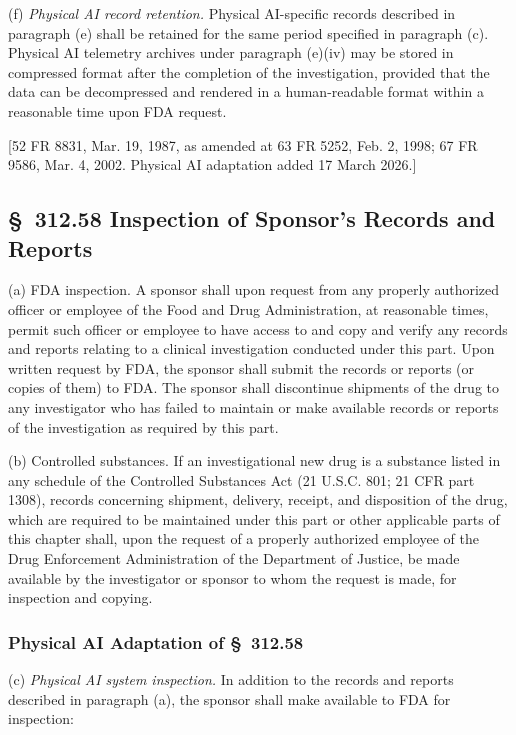 \documentclass[11pt]{article}
\begin{document}
(f) \textit{Physical AI record retention.} Physical AI-specific records described in paragraph (e) shall be retained for the same period specified in paragraph (c). Physical AI telemetry archives under paragraph (e)(iv) may be stored in compressed format after the completion of the investigation, provided that the data can be decompressed and rendered in a human-readable format within a reasonable time upon FDA request.

[52 FR 8831, Mar. 19, 1987, as amended at 63 FR 5252, Feb. 2, 1998; 67 FR 9586, Mar. 4, 2002. Physical AI adaptation added 17 March 2026.]

\subsection{\S~312.58 Inspection of Sponsor's Records and Reports}

(a) FDA inspection. A sponsor shall upon request from any properly authorized officer or employee of the Food and Drug Administration, at reasonable times, permit such officer or employee to have access to and copy and verify any records and reports relating to a clinical investigation conducted under this part. Upon written request by FDA, the sponsor shall submit the records or reports (or copies of them) to FDA. The sponsor shall discontinue shipments of the drug to any investigator who has failed to maintain or make available records or reports of the investigation as required by this part.

(b) Controlled substances. If an investigational new drug is a substance listed in any schedule of the Controlled Substances Act (21 U.S.C. 801; 21 CFR part 1308), records concerning shipment, delivery, receipt, and disposition of the drug, which are required to be maintained under this part or other applicable parts of this chapter shall, upon the request of a properly authorized employee of the Drug Enforcement Administration of the Department of Justice, be made available by the investigator or sponsor to whom the request is made, for inspection and copying.

\subsubsection{Physical AI Adaptation of \S~312.58}

(c) \textit{Physical AI system inspection.} In addition to the records and reports described in paragraph (a), the sponsor shall make available to FDA for inspection:
\end{document}
